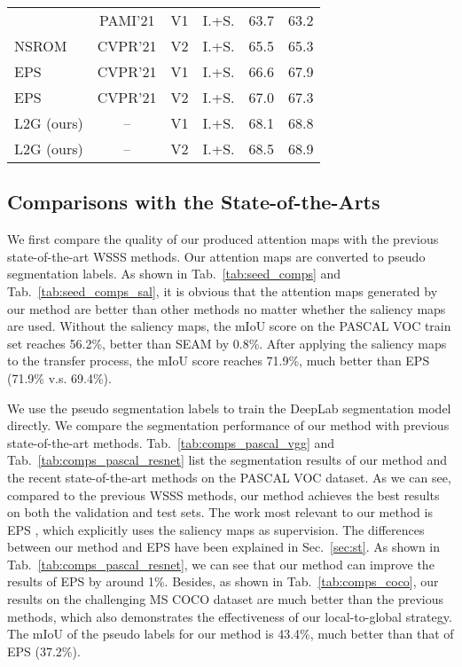 \documentclass[10pt,twocolumn,letterpaper]{article}
\newcommand{\tabref}[1]{Tab.~\ref{#1}}
\newcommand{\secref}[1]{Sec.~\ref{#1}}
\begin{document}
\begin{table}[t]
{\begin{tabular}{l|c|c|c|c|c}
         \cite{jiang2021online}  &  PAMI'21 & V1  & I.+S.  & 63.7       & 63.2 \\
        NSROM \cite{yao2021non}                    &  CVPR'21 & V2   & I.+S.  & 65.5       & 65.3 \\
        EPS \cite{lee2021railroad}                 &  CVPR'21 & V1   & I.+S.  & 66.6       & 67.9 \\
        EPS \cite{lee2021railroad}                 &  CVPR'21 & V2   & I.+S.  & 67.0       & 67.3 \\
        \rowcolor{gray!32} L2G (ours)              &  --      & V1   & I.+S.  & 68.1       &  68.8    \\
        \rowcolor{gray!32} L2G (ours)              &  --      & V2   & I.+S.  & 68.5       &  68.9    \\
        \bottomrule[1pt]
        \end{tabular} }
        \vspace{-10pt}
\end{table}

\subsection{Comparisons with the State-of-the-Arts} \label{sec:exp_comp}
We first compare the quality of our produced attention maps
with the previous state-of-the-art WSSS methods.
Our attention maps are converted to pseudo segmentation labels.
As shown in \tabref{tab:seed_comps} and \tabref{tab:seed_comps_sal}, 
it is obvious that the attention maps generated by our method are 
better than other methods no matter whether the saliency maps
are used.
Without the saliency maps, the mIoU score on the PASCAL VOC train set reaches 56.2\%, better than SEAM \cite{wang2020self} by 0.8\%. 
After applying the saliency maps to the transfer process, 
the mIoU score reaches 71.9\%, much better than
EPS \cite{lee2021railroad} (71.9\% v.s. 69.4\%).




We use the pseudo segmentation labels to train the DeepLab 
segmentation model directly.
We compare the segmentation performance of our method with previous 
state-of-the-art methods.
\tabref{tab:comps_pascal_vgg} and \tabref{tab:comps_pascal_resnet} list 
the segmentation results of our method and the recent state-of-the-art methods 
on the PASCAL VOC dataset.
As we can see, compared to the previous WSSS methods, 
our method achieves the best results on both the validation and
test sets.
The work most relevant to our method is EPS \cite{lee2021railroad}, 
which explicitly uses the saliency maps as supervision.
The differences between our method and EPS have been explained in
\secref{sec:st}.
As shown in \tabref{tab:comps_pascal_resnet}, 
we can see that our method can improve 
the results of EPS by around 1\%.
Besides, as shown in \tabref{tab:comps_coco}, our results on the 
challenging MS COCO dataset are much better than the previous methods,
which also demonstrates the effectiveness 
of our local-to-global strategy.
The mIoU of the pseudo labels for our method is 43.4\%, 
much better than that of EPS (37.2\%).
\end{document}
